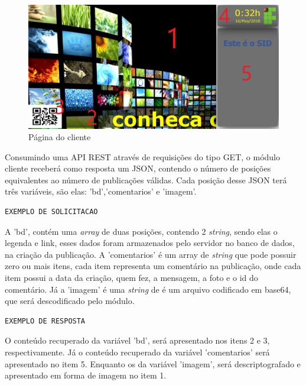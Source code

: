 \begin{figure}[H]
\centering
\includegraphics[scale=0.3]{figuras/cliente1}
\caption{Página do cliente}
\label{fig:cliente1}
\end{figure}

Consumindo uma API REST através de requisições do tipo GET, o módulo cliente receberá como resposta um JSON, contendo o número de posições equivalentes ao número de publicações válidas. Cada posição desse JSON terá três variáveis, são elas: 'bd','comentarios' e 'imagem'. 

\begin{lstlisting}[caption={Solicitação de dados ao servidor},label={lst:solicitacaoServidor}]
EXEMPLO DE SOLICITACAO
\end{lstlisting}

A 'bd', contém uma \textit{array} de duas posições, contendo 2 \textit{string}, sendo elas o legenda e link, esses dados foram armazenados pelo servidor no banco de dados, na criação da publicação. A 'comentarios' é um array de \textit{string} que pode possuir zero ou mais itens, cada item representa um comentário na publicação, onde cada item possui a data da criação, quem fez, a mensagem, a foto e o id do comentário. Já a 'imagem' é uma \textit{string} de é um arquivo codificado em base64, que será descodificado pelo módulo.

\begin{lstlisting}[caption={Resposta do servidor \ref{lst:solicitacaoServidor}},label={lst:RespostaServidor}]
EXEMPLO DE RESPOSTA
\end{lstlisting}

O conteúdo recuperado da variável 'bd', será apresentado nos itens 2 e 3, respectivamente. Já o conteúdo recuperado da variável 'comentarios' será apresentado no item 5. Enquanto os da variável 'imagem', será descriptografado e apresentado em forma de imagem no item 1.

